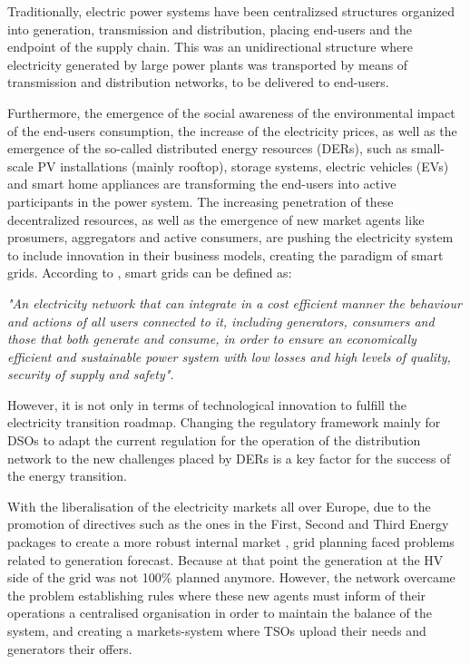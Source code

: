 Traditionally, electric power systems have been centralizsed structures organized into generation, transmission and distribution, placing end-users and the endpoint of the supply chain. This was an unidirectional structure where electricity generated by large power plants was transported by means of transmission and distribution networks, to be delivered to end-users. 

Furthermore, the emergence of the social awareness of the environmental impact of the end-users consumption, the increase of the electricity prices, as well as the emergence of the so-called distributed energy resources (DERs), such as small-scale PV installations (mainly rooftop), storage systems, electric vehicles (EVs) and smart home appliances are transforming the end-users into active participants in the power system. The increasing penetration of these decentralized resources, as well as the emergence of new market agents like prosumers, aggregators and active consumers, are pushing the electricity system to include innovation in their business models, creating the paradigm of smart grids. According to \cite{EuropeanParliamentSG}, smart grids can be defined as:
\vspace*{3mm}
\begin{tcolorbox}
\textit{"An electricity network that can integrate in a cost efficient manner the behaviour and actions of all users connected to it, including generators, consumers and those that both generate and consume, in order to ensure an economically efficient and sustainable power system with low losses and high levels of quality, security of supply and safety".} 
\end{tcolorbox}
\vspace*{5mm}


However, it is not only in terms of technological innovation to fulfill the electricity transition roadmap. Changing the regulatory framework mainly for DSOs to adapt the current regulation for the operation of the distribution network to the new challenges placed by DERs is a key factor for the success of the energy transition.

With the liberalisation of the electricity markets all over Europe, due to the promotion of directives such as the ones in the First, Second and Third Energy packages \cite{EuropeanCommission2003, EuropeanCommission2009} to create a more robust internal market \cite{Hancher2017, EUPHEMIA2016, antonopoulos2020nodal}, grid planning faced problems related to generation forecast. Because at that point the generation at the HV side of the grid was not 100$\%$ planned anymore. However, the network overcame the problem establishing rules where these new agents must inform of their operations a centralised organisation in order to maintain the balance of the system, and creating a markets-system where TSOs upload their needs and generators their offers. 

